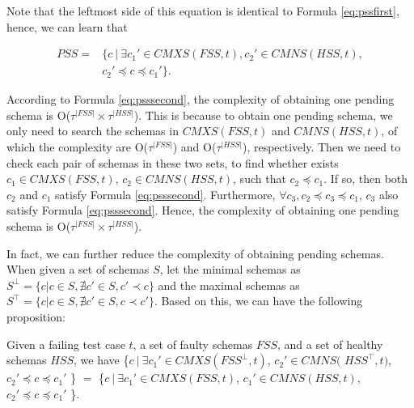 {Note that the leftmost side of this equation is identical to Formula \ref{eq:pssfirst}, hence, we can learn that



\begin{equation}\label{eq:psssecond}
\begin{aligned}
PSS = & \{ c\ |\ \exists c_{1}' \in CMXS(FSS, t), c_{2}' \in CMNS(HSS, t), \\
    & c_{2}' \preceq c \preceq c_{1}' \}.
\end{aligned}
\end{equation}

According to Formula \ref{eq:psssecond}, the complexity of obtaining one pending schema is O($ \tau^{|FSS|} \times \tau^{|HSS|}$). This is because to obtain one pending schema, we only need to search the schemas in $CMXS(FSS, t)$ and $CMNS(HSS, t)$, of which the complexity are O($\tau^{|FSS|}$) and O($\tau^{|HSS|}$), respectively. Then we need to check each pair of schemas in these two sets, to find whether exists $c_{1} \in CMXS(FSS, t)$, $c_{2} \in CMNS(HSS, t)$, such that $c_{2} \preceq c_{1}$. If so, then both $c_{2}$ and $c_{1}$ satisfy Formula \ref{eq:psssecond}. Furthermore, $\forall c_{3}, c_{2} \preceq c_{3} \preceq c_{1}$, $c_{3}$ also satisfy Formula \ref{eq:psssecond}. Hence, the complexity of obtaining one pending schema is O($\tau^{|FSS|} \times \tau^{|HSS|}$).

In fact, we can further reduce the complexity of obtaining pending schemas. When given a set of schemas $S$, let the minimal schemas as $S^{\bot } = \{ c | c \in S, \nexists c' \in S, c' \prec c \}$ and the maximal schemas as $S^{\top } = \{ c | c \in S, \nexists c' \in S, c \prec c' \}$. Based on this, we can have the following proposition:

\begin{proposition}\label{pro:identicialPending}
Given a failing test case $t$, a set of faulty schemas $FSS$, and a set of healthy schemas $HSS$, we have \{$ c\ |\ \exists c_{1}' \in CMXS(FSS^{\bot}, t)$, $ c_{2}' \in CMNS($ $HSS^{\top}, t)$, $c_{2}' \preceq c \preceq c_{1}'$ \} $=$  \{$ c\ |\ \exists c_{1}' \in CMXS(FSS, t)$, $c_{1}' \in CMNS(HSS, t)$, $c_{2}' \preceq c \preceq c_{1}'$ \}.
\end{proposition}

}
